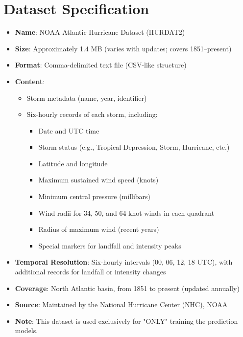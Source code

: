 \section{Dataset Specification}
\begin{itemize}
\item \textbf{Name}: NOAA Atlantic Hurricane Dataset (HURDAT2)
\item \textbf{Size}: Approximately 1.4 MB (varies with updates; covers 1851–present)
\item \textbf{Format}: Comma-delimited text file (CSV-like structure)
\item \textbf{Content}:
\begin{itemize}
	\item Storm metadata (name, year, identifier)
	\item Six-hourly records of each storm, including:
	\begin{itemize}
		\item Date and UTC time
		\item Storm status (e.g., Tropical Depression, Storm, Hurricane, etc.)
		\item Latitude and longitude
		\item Maximum sustained wind speed (knots)
		\item Minimum central pressure (millibars)
		\item Wind radii for 34, 50, and 64 knot winds in each quadrant
		\item Radius of maximum wind (recent years)
		\item Special markers for landfall and intensity peaks
	\end{itemize}
\end{itemize}
\item \textbf{Temporal Resolution}: Six-hourly intervals (00, 06, 12, 18 UTC), with additional records for landfall or intensity changes
\item \textbf{Coverage}: North Atlantic basin, from 1851 to present (updated annually)
\item \textbf{Source}: Maintained by the National Hurricane Center (NHC), NOAA
\item \textbf{Note}: This dataset is used exclusively for "ONLY" training the prediction models.
\end{itemize}



